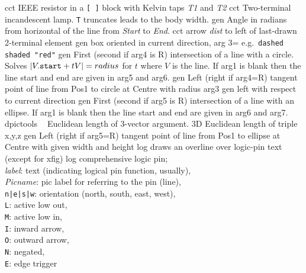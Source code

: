 %
%
%
  {cct}%
  {IEEE resistor in a {\tt [ ]} block with Kelvin taps {\sl T1} and {\sl T2}%
   }%
%
%
%
  {cct}%
  {Two-terminal incandescent lamp. {\tt T} truncates leads to the body width.
   }%
%
  {gen}%
  {Angle in radians from horizontal of the line from {\sl Start}%
  to {\sl End}.}%
%
  {cct}%
  {arrow {\sl dist} to left of last-drawn 2-terminal element
   }%
%
  {gen}%
  {box oriented in current direction, arg 3= e.g.\ {\tt dashed shaded "red"}}%
%
  {gen}%
  { First (second if arg4 is R) intersection of a line with a circle.
    Solves $|V.{\tt start} + tV| = {\sl radius}$ for $t$ where $V$ is the line.
    If arg1 is blank then the line start and end are given in arg5 and arg6.}%
%
  {gen}%
  { Left (right if arg4=R) tangent point of line
     from Pos1 to circle at Centre with radius arg3}%
%
  {gen}%
  {left with respect to current direction }%
%
  {gen}%
  { First (second if arg5 is R) intersection of a line with an ellipse.
    If arg1 is blank then the line start and end are given in arg6 and arg7.}%
%
  {dpictools}%
  {$\;\;$ Euclidean length of 3-vector argument.}%
%
  {3D}%
  {Euclidean length of triple x,y,z}%
%
  {gen}%
  { Left (right if arg5=R) tangent point of line
     from Pos1 to ellipse at Centre with given width and height}%
%
  {log}%
  {draws an overline over logic-pin text (except for xfig)}%
%
  {log}%
  {comprehensive logic pin;\\
   {\sl label}: text (indicating logical pin function, usually),\\
   {\sl Picname}: pic label for referring to the pin (line),\\
   {\tt n|e|s|w}: orientation (north, south, east, west),\\
   {\tt L}: active low out,\\
   {\tt M}: active low in,\\
   {\tt I}: inward arrow,\\
   {\tt O}: outward arrow,\\
   {\tt N}: negated,\\
   {\tt E}: edge trigger}%
